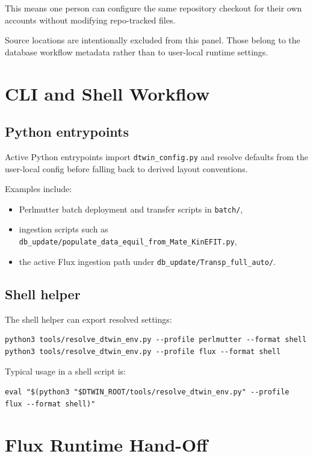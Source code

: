 \documentclass[11pt]{article}
\newcommand{\code}[1]{\texttt{#1}}
\begin{document}
This means one person can configure the same repository checkout for their own
accounts without modifying repo-tracked files.

Source locations are intentionally excluded from this panel. Those belong to the
database workflow metadata rather than to user-local runtime settings.

\section{CLI and Shell Workflow}

\subsection{Python entrypoints}

Active Python entrypoints import \code{dtwin\_config.py} and resolve defaults
from the user-local config before falling back to derived layout conventions.

Examples include:

\begin{itemize}
\item Perlmutter batch deployment and transfer scripts in \code{batch/},
\item ingestion scripts such as
\code{db\_update/populate\_data\_equil\_from\_Mate\_KinEFIT.py},
\item the active Flux ingestion path under \code{db\_update/Transp\_full\_auto/}.
\end{itemize}

\subsection{Shell helper}

The shell helper can export resolved settings:

\begin{verbatim}
python3 tools/resolve_dtwin_env.py --profile perlmutter --format shell
python3 tools/resolve_dtwin_env.py --profile flux --format shell
\end{verbatim}

Typical usage in a shell script is:

\begin{verbatim}
eval "$(python3 "$DTWIN_ROOT/tools/resolve_dtwin_env.py" --profile flux --format shell)"
\end{verbatim}

\section{Flux Runtime Hand-Off}
\end{document}

